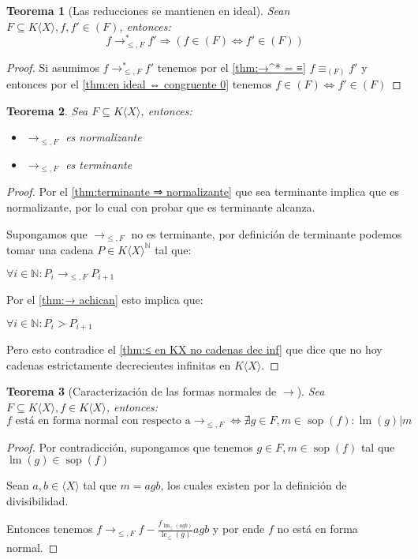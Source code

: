 \documentclass{amsbook} %
\theoremstyle{customstyle}
\newtheorem{theorem}{Teorema}[section]
\DeclareMathOperator{\sop}{sop}
\DeclareMathOperator{\lm}{lm}
\DeclareMathOperator{\lc}{lc}
\begin{document}
\begin{theorem}[Las reducciones se mantienen en ideal]\label{thm:→ mantiene pertenencia a ideal}
Sean $F ⊆ K⟨X⟩, f, f' ∈ (F)$, entonces:
\[ f →^*_{≤, F} f' ⇒ (f ∈ (F) ⇔ f' ∈ (F)) \]
\end{theorem}
\begin{proof}
Si asumimos $f →^*_{≤, F} f'$ tenemos por el \cref{thm:→^* = ≡} $f ≡_{(F)} f'$ y entonces por el \cref{thm:en ideal ⇔ congruente 0} tenemos $f ∈ (F) ⇔ f' ∈ (F)$
\end{proof}

\begin{theorem}
Sea $F ⊆ K⟨X⟩$, entonces:
\begin{itemize}
\item $→_{≤, F}$ es normalizante
\item $→_{≤, F}$ es terminante
\end{itemize}
\end{theorem}
\begin{proof}
Por el \cref{thm:terminante ⇒ normalizante} que sea terminante implica que es normalizante, por lo cual con probar que es terminante alcanza.

Supongamos que $→_{≤, F}$ no es terminante, por definición de terminante podemos tomar una cadena $P ∈ K⟨X⟩^ℕ$ tal que:

$∀i ∈ ℕ : P_i →_{≤, F} P_{i+1}$

Por el \cref{thm:→ achican} esto implica que:

$∀i ∈ ℕ : P_i > P_{i+1}$

Pero esto contradice el \cref{thm:≤ en KX no cadenas dec inf} que dice que no hoy cadenas estrictamente decrecientes infinitas en $K⟨X⟩$.

\end{proof}

\begin{theorem}[Caracterización de las formas normales de $→$]
Sea $F ⊆ K⟨X⟩, f ∈ K⟨X⟩$, entonces: %
\[ f\text{ está en forma normal con respecto a} →_{≤, F} ⇔ ∄g ∈ F, m ∈ \sop(f) : \lm(g) | m \]
\end{theorem}
\begin{proof}
Por contradicción, supongamos que tenemos $g ∈ F, m ∈ \sop(f)$ tal que $\lm(g) ∈ \sop(f)$

Sean $a, b ∈ ⟨X⟩$ tal que $m = agb$, los cuales existen por la definición de divisibilidad.

Entonces tenemos $f →_{≤, F} f - \frac{f_{\lm_≤(agb)}}{\lc_≤(g)}agb$ y por ende $f$ no está en forma normal.

\end{proof}
\end{document}

